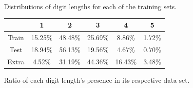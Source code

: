 \documentclass[12pt]{article}
\begin{document}
\begin{figure}[!htb]
\centering
{}\hfill
{}\hfill
{}\hfill
\caption{Distributions of digit lengths for each of the training sets.}
\label{fig:digit_length_plots}
\end{figure}

\begin{figure}[!htb]
\begin{center}
\begin{tabular}{ |c|c|c|c|c|c| }
\hline
       & 1       & 2       & 3       & 4       & 5       \\
\hline
Train  & 15.25\% & 48.48\% & 25.69\% & 8.86\%  & 1.72\%  \\
\hline
Test   & 18.94\% & 56.13\% & 19.56\% & 4.67\%  & 0.70\%  \\
\hline
Extra  & 4.52\%  & 31.19\% & 44.36\% & 16.43\% & 3.48\%  \\
\hline
\end{tabular}
\end{center}
\caption{Ratio of each digit length's presence in its respective data set.}
\label{fig:digit_length_table}
\end{figure}
\end{document}
